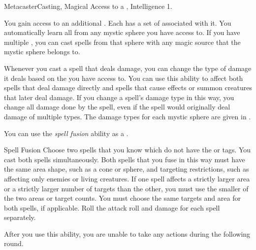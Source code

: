     \begin{feat}{Metacaster}{Casting, Magical}
        \featpre Access to a , Intelligence 1.

         You gain access to an additional .
        Each  has a set of  associated with it.
        You automatically learn all  from any mystic sphere you have access to.
        If you have multiple , you can cast spells from that sphere with any magic source that the mystic sphere belongs to.

         Whenever you cast a spell that deals damage, you can change the type of damage it deals based on the  you have access to.
        You can use this ability to affect both spells that deal damage directly and spells that cause effects or summon creatures that later deal damage.
        If you change a spell's damage type in this way, you change all damage done by the spell, even if the spell would originally deal damage of multiple types.
        The damage types for each mystic sphere are given in .

         You can use the \textit{spell fusion} ability as a .
        \begin{freeability}{Spell Fusion}
            Choose two spells that you know which do not have the  or  tags.
            You cast both spells simultaneously.
            Both spells that you fuse in this way must have the same area shape, such as a cone or sphere, and targeting restrictions, such as affecting only enemies or living creatures.
            If one spell affects a strictly larger area or a strictly larger number of targets than the other, you must use the smaller of the two areas or target counts.
            You must choose the same targets and area for both spells, if applicable.
            Roll the attack roll and damage for each spell separately.

            After you use this ability, you are unable to take any actions during the following round.
        \end{freeability}


\end{feat}
